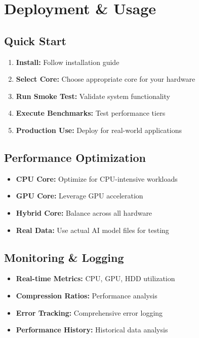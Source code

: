 \documentclass[12pt,a4paper]{article}
\begin{document}
\section{Deployment \& Usage}

\subsection{Quick Start}
\begin{enumerate}
    \item \textbf{Install:} Follow installation guide
    \item \textbf{Select Core:} Choose appropriate core for your hardware
    \item \textbf{Run Smoke Test:} Validate system functionality
    \item \textbf{Execute Benchmarks:} Test performance tiers
    \item \textbf{Production Use:} Deploy for real-world applications
\end{enumerate}

\subsection{Performance Optimization}
\begin{itemize}
    \item \textbf{CPU Core:} Optimize for CPU-intensive workloads
    \item \textbf{GPU Core:} Leverage GPU acceleration
    \item \textbf{Hybrid Core:} Balance across all hardware
    \item \textbf{Real Data:} Use actual AI model files for testing
\end{itemize}

\subsection{Monitoring \& Logging}
\begin{itemize}
    \item \textbf{Real-time Metrics:} CPU, GPU, HDD utilization
    \item \textbf{Compression Ratios:} Performance analysis
    \item \textbf{Error Tracking:} Comprehensive error logging
    \item \textbf{Performance History:} Historical data analysis
\end{itemize}
\end{document}
